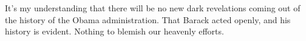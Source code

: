 

﻿It's my understanding that there will be no new dark revelations
coming out of the history of the Obama administration.  That Barack
acted openly, and his history is evident.  Nothing to blemish our
heavenly efforts.

\bye
